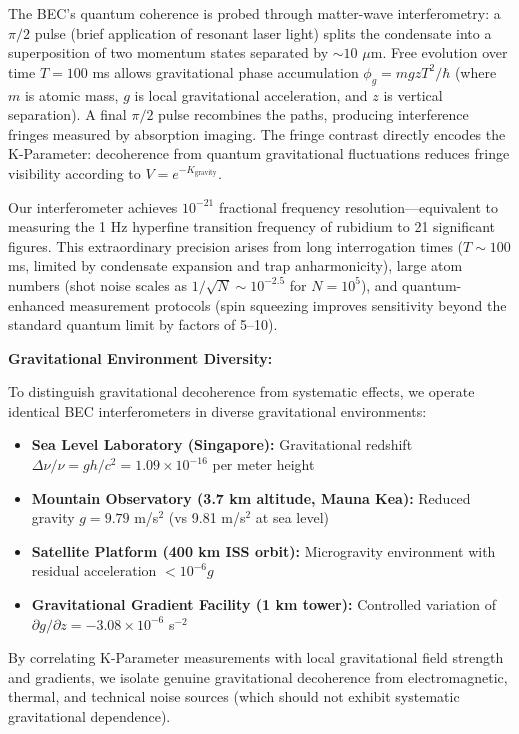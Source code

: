 \documentclass[11pt,a4paper,twoside]{article}
\begin{document}
The BEC's quantum coherence is probed through matter-wave interferometry: a $\pi/2$ pulse (brief application of resonant laser light) splits the condensate into a superposition of two momentum states separated by $\sim 10$ $\mu$m. Free evolution over time $T = 100$ ms allows gravitational phase accumulation $\phi_g = m g z T^2 / \hbar$ (where $m$ is atomic mass, $g$ is local gravitational acceleration, and $z$ is vertical separation). A final $\pi/2$ pulse recombines the paths, producing interference fringes measured by absorption imaging. The fringe contrast directly encodes the K-Parameter: decoherence from quantum gravitational fluctuations reduces fringe visibility according to $V = e^{-K_{\text{gravity}}}$.

Our interferometer achieves $10^{-21}$ fractional frequency resolution---equivalent to measuring the 1 Hz hyperfine transition frequency of rubidium to 21 significant figures. This extraordinary precision arises from long interrogation times ($T \sim 100$ ms, limited by condensate expansion and trap anharmonicity), large atom numbers (shot noise scales as $1/\sqrt{N} \sim 10^{-2.5}$ for $N = 10^5$), and quantum-enhanced measurement protocols (spin squeezing improves sensitivity beyond the standard quantum limit by factors of 5--10).

\textbf{Gravitational Environment Diversity:}

To distinguish gravitational decoherence from systematic effects, we operate identical BEC interferometers in diverse gravitational environments:

\begin{itemize}[leftmargin=*]
\item \textbf{Sea Level Laboratory (Singapore):} Gravitational redshift $\Delta\nu/\nu = gh/c^2 = 1.09 \times 10^{-16}$ per meter height
\item \textbf{Mountain Observatory (3.7 km altitude, Mauna Kea):} Reduced gravity $g = 9.79$ m/s$^2$ (vs 9.81 m/s$^2$ at sea level)
\item \textbf{Satellite Platform (400 km ISS orbit):} Microgravity environment with residual acceleration $<10^{-6}g$
\item \textbf{Gravitational Gradient Facility (1 km tower):} Controlled variation of $\partial g/\partial z = -3.08 \times 10^{-6}$ s$^{-2}$
\end{itemize}

By correlating K-Parameter measurements with local gravitational field strength and gradients, we isolate genuine gravitational decoherence from electromagnetic, thermal, and technical noise sources (which should not exhibit systematic gravitational dependence).
\end{document}
